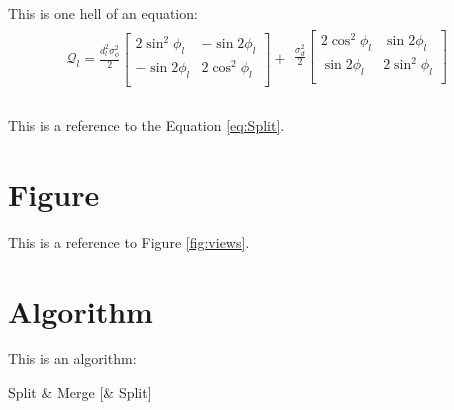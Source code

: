 This is one hell of an equation:
\begin{equation}
\begin{array}{c}
 \mathcal{Q}_l  = \frac{{d_l ^2 \sigma _\phi  ^2 }}{2}\left[ {\begin{array}{cc}
   {2\sin ^2 \phi _l } & { - \sin 2\phi _l }  \\
   { - \sin 2\phi _l } & {2\cos ^2 \phi _l }  \\
\end{array}} \right] +
 \begin{array}{cc}
   {\frac{{\sigma _d ^2 }}{2}\left[ {\begin{array}{cc}
   {2\cos ^2 \phi _l } & {\sin 2\phi _l }  \\
   {\sin 2\phi _l } & {2\sin ^2 \phi _l }  \\
\end{array}} \right]}  \\
\end{array} \\
 \end{array}
\label{eq:defQ}
\end{equation}

This is a reference to the Equation \ref{eq:Split}.

\section{Figure}
\label{sec:figure}


This is a reference to Figure \ref{fig:views}.

\section{Algorithm} 
\label{sec:algorithm}

This is an algorithm:
\begin{algorithm}
\label{alg:SMS}
\caption{Split \& Merge [\& Split]}
\begin{algorithmic} [1]
\ELSE
{}
\ENDIF
\ENDWHILE
{}
\end{algorithmic}
\end{algorithm}